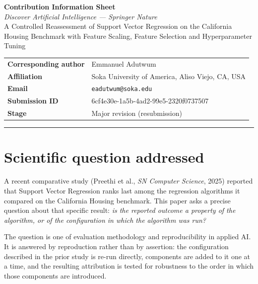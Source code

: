 \documentclass[11pt,a4paper]{article}
\begin{document}
\begin{center}
{\Large\bfseries Contribution Information Sheet}\\[3pt]
{\normalsize\itshape Discover Artificial Intelligence --- Springer Nature}\\[10pt]
{\large A Controlled Reassessment of Support Vector Regression on the California\\
Housing Benchmark with Feature Scaling, Feature Selection and Hyperparameter Tuning}
\end{center}

\vspace{6pt}
\begin{center}
\begin{tabular}{@{}ll@{}}
\textbf{Corresponding author} & Emmanuel Adutwum \\
\textbf{Affiliation}          & Soka University of America, Aliso Viejo, CA, USA \\
\textbf{Email}                & \texttt{eadutwum@soka.edu} \\
\textbf{Submission ID}        & 6cf4e30e-1a5b-4ad2-99e5-2320f0737507 \\
\textbf{Stage}                & Major revision (resubmission) \\
\end{tabular}
\end{center}

\vspace{4pt}
\hrule
\vspace{8pt}

\section{Scientific question addressed}
A recent comparative study (Preethi et al., \emph{SN Computer Science}, 2025) reported that
Support Vector Regression ranks last among the regression algorithms it compared on the
California Housing benchmark. This paper asks a precise question about that specific result:
\emph{is the reported outcome a property of the algorithm, or of the configuration in which
the algorithm was run?}

The question is one of evaluation methodology and reproducibility in applied AI. It is
answered by reproduction rather than by assertion: the configuration described in the prior
study is re-run directly, components are added to it one at a time, and the resulting
attribution is tested for robustness to the order in which those components are introduced.
\end{document}
